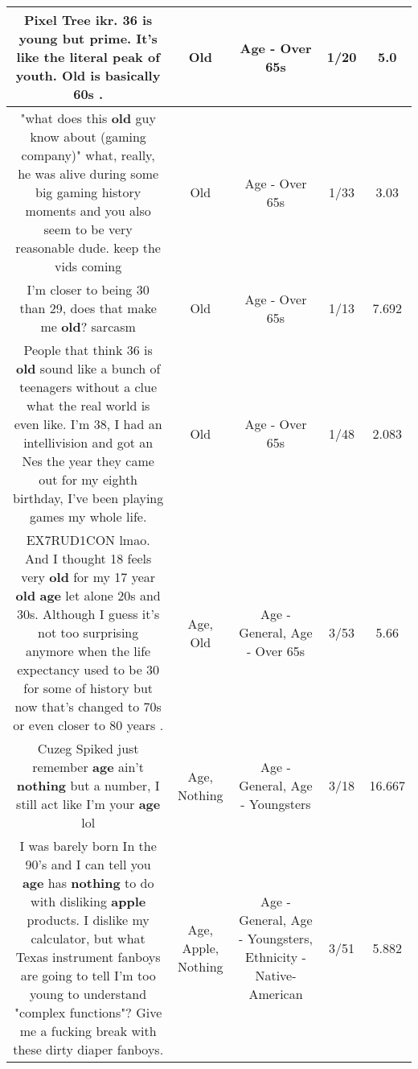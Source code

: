 \documentclass[11pt]{article}
\newlength\mylength
\begin{document}
\begin{center}
\begin{longtable}{|C{.65\mylength}|C{.30\mylength}|C{.12\mylength}|C{.12\mylength}|C{.12\mylength}|}
  \small Pixel Tree  ikr. 36 is young but prime. It's like the literal peak of youth. \textbf{Old} is basically 60s .\normalsize   & Old & Age - Over 65s & 1/20 & 5.0 \\  \hline
  \small "what does this \textbf{old} guy know about (gaming company)" what, really, he was alive during some big gaming history moments and you also seem to be very reasonable dude. keep the vids coming\normalsize   & Old & Age - Over 65s & 1/33 & 3.03 \\  \hline
  \small I'm closer to being 30 than 29, does that make me \textbf{old}? sarcasm\normalsize   & Old & Age - Over 65s & 1/13 & 7.692 \\  \hline
  \small People that think 36 is \textbf{old} sound like a bunch of teenagers without a clue what the real world is even like. I'm 38, I had an intellivision and got an Nes the year they came out for my eighth birthday, I've been playing games my whole life.\normalsize   & Old & Age - Over 65s & 1/48 & 2.083 \\  \hline
  \small EX7RUD1CON lmao. And I thought 18 feels very \textbf{old} for my 17 year \textbf{old} \textbf{age} let alone 20s and 30s. Although I guess it's not too surprising anymore when the life expectancy used to be 30 for some of history but now that's changed to 70s or even closer to 80 years .\normalsize   & Age, Old & Age - General, Age - Over 65s & 3/53 & 5.66 \\  \hline
  \small Cuzeg Spiked just remember \textbf{age} ain't \textbf{nothing} but a number, I still act like I'm your \textbf{age} lol\normalsize   & Age, Nothing & Age - General, Age - Youngsters & 3/18 & 16.667 \\  \hline
  \small I was barely born In the 90's and I can tell you \textbf{age} has \textbf{nothing} to do with disliking \textbf{apple} products. I dislike my calculator, but what Texas instrument fanboys are going to tell I'm too young to understand "complex functions"? Give me a fucking break with these dirty diaper fanboys.\normalsize   & Age, Apple, Nothing & Age - General, Age - Youngsters, Ethnicity - Native-American & 3/51 & 5.882 \\  \hline

\end{longtable}
\end{center}
\end{document}
